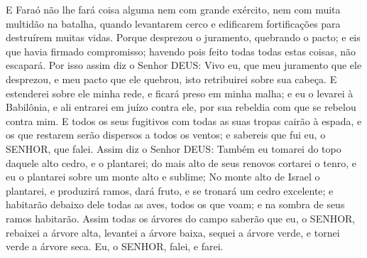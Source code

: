 {E Faraó não lhe fará coisa alguma nem com grande exército, nem com muita multidão na batalha, quando levantarem cerco e edificarem fortificações para destruírem muitas vidas.
Porque desprezou o juramento, quebrando o pacto; e eis que havia firmado compromisso; havendo pois feito todas todas estas coisas, não escapará.
Por isso assim diz o Senhor DEUS: Vivo eu, que meu juramento que ele desprezou, e meu pacto que ele quebrou, isto retribuirei sobre sua cabeça.
E estenderei sobre ele minha rede, e ficará preso em minha malha; e eu o levarei à Babilônia, e ali entrarei em juízo contra ele, por sua rebeldia com que se rebelou contra mim.
E todos os seus fugitivos com todas as suas tropas cairão à espada, e os que restarem serão dispersos a todos os ventos; e sabereis que fui eu, o SENHOR, que falei.
Assim diz o Senhor DEUS: Também eu tomarei do topo daquele alto cedro, e o plantarei; do mais alto de seus renovos cortarei o
{} tenro, e eu o plantarei sobre um monte alto e sublime;
No monte alto de Israel o plantarei, e produzirá ramos, dará fruto, e se tronará um cedro excelente; e habitarão debaixo dele todas as aves, todos os que voam; e na sombra de seus ramos habitarão.
Assim todas os árvores do campo saberão que eu, o SENHOR, rebaixei a árvore alta, levantei a árvore baixa, sequei a árvore verde, e tornei verde a árvore seca. Eu, o SENHOR, falei, e farei.

}
